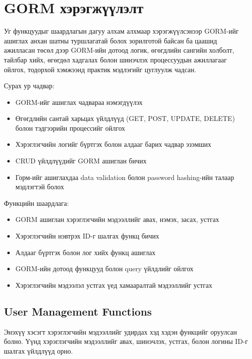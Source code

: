 
\section{GORM хэрэгжүүлэлт}

Уг функцуудыг шаардлагын дагуу алхам алхмаар хэрэгжүүлсэнээр GORM-ийг ашиглах анхан шатны туршлагатай болох зорилготой байсан ба цаашид ажилласан төсөл дээр GORM-ийн дотоод логик, өгөгдлийн сангийн холболт, тайлбар хийх, өгөгдөл хадгалах болон шинэчлэх процессуудын ажиллагааг ойлгох, тодорхой хэмжээнд практик мэдлэгийг цуглуулж чадсан.

Сурах ур чадвар: 
\begin{itemize} 
	\item GORM-ийг ашиглах чадвараа нэмэгдүүлэх 
	\item Өгөгдлийн сантай харьцах үйлдлүүд (GET, POST, UPDATE, DELETE) болон тэдгээрийн процессийг ойлгох 
	\item Хэрэглэгчийн логийг бүртгэх болон алдааг барих чадвар эзэмших 
	\item CRUD үйлдлүүдийг GORM ашиглан бичих 
	\item Горм-ийг ашиглахдаа data validation болон password hashing-ийн талаар мэдлэгтэй болох \end{itemize}

Функцийн шаардлага: 
\begin{itemize} 
	\item GORM ашиглан хэрэглэгчийн мэдээллийг авах, нэмэх, засах, устгах 
	\item Хэрэглэгчийн нэвтрэх ID-г шалгах функц бичих 
	\item Алдааг бүртгэх болон лог хийх функц ашиглах 
	\item GORM-ийн дотоод функцууд болон query үйлдлийг ойлгох 
	\item Хэрэглэгчийн мэдээлэл устгах үед хамааралтай мэдээллийг устгах
\end{itemize}
	
\subsection{User Management Functions}

Энэхүү хэсэгт хэрэглэгчийн мэдээллийг удирдах хэд хэдэн функцийг оруулсан болно. Үүнд хэрэглэгчийн мэдээллийг авах, шинэчлэх, устгах, болон логины ID-г шалгах үйлдлүүд орно.

